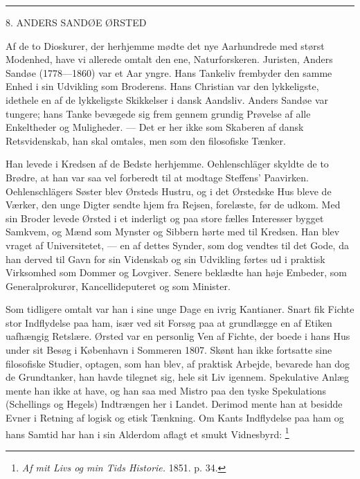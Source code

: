 \documentclass[12pt,a4paper,openany]{book}
\newcommand{\opage}[1]{\marginnote{\footnotesize\textit{[#1]}}}
\begin{document}
\begin{center}\rule{2cm}{0.4pt}\end{center}

\setcounter{footnote}{0}%
\opage{73}

\begin{center}\large 8. ANDERS SANDØE ØRSTED\end{center}

Af de to Dioskurer, der herhjemme mødte det nye Aarhundrede med størst
Modenhed, have vi allerede omtalt den ene, Naturforskeren. Juristen, Anders
Sandøe (1778---1860) var et Aar yngre. Hans Tankeliv frembyder den samme Enhed
i sin Udvikling som Broderens. Hans Christian var den lykkeligste, idethele en
af de lykkeligste Skikkelser i dansk Aandsliv. Anders Sandøe var tungere; hans
Tanke bevægede sig frem gennem grundig Prøvelse af alle Enkeltheder og
Muligheder. --- Det er her ikke som Skaberen af dansk Retsvidenskab, han skal
omtales, men som den filosofiske Tænker.

Han levede i Kredsen af de Bedste herhjemme. Oehlenschläger skyldte de to
Brødre, at han var saa vel forberedt til at modtage Steffens' Paavirken.
Oehlenschlägers Søster blev Ørsteds Hustru, og i det Ørstedske Hus bleve de
Værker, den unge Digter sendte hjem fra Rejsen, forelæste, før de udkom. Med
sin Broder levede Ørsted i et inderligt og paa store fælles Interesser bygget
Samkvem, og Mænd som Mynster og Sibbern hørte med til Kredsen. Han blev vraget
af Universitetet, --- en af dettes Synder, som dog vendtes til det Gode, da han
derved til Gavn for sin Videnskab og sin Udvikling førtes ud i praktisk
Virksomhed som Dommer og Lovgiver. Senere beklædte han høje Embeder, som
Generalprokurør, Kancellideputeret og som Minister.

Som tidligere omtalt var han i sine unge Dage en ivrig Kantianer. Snart fik
Fichte stor Indflydelse paa ham, især ved sit Forsøg paa at grundlægge en af
Etiken uafhængig Retslære. Ørsted var en personlig Ven af Fichte, der boede
\setcounter{footnote}{0}%
\opage{74}i hans Hus under sit Besøg i København i Sommeren 1807. Skønt han
ikke fortsatte sine filosofiske Studier, optagen, som han blev, af praktisk
Arbejde, bevarede han dog de Grundtanker, han havde tilegnet sig, hele sit Liv
igennem. Spekulative Anlæg mente han ikke at have, og han saa med Mistro paa
den tyske Spekulations (Schellings og Hegels) Indtrængen her i Landet. Derimod
mente han at besidde Evner i Retning af logisk og etisk Tænkning. Om Kants
Indflydelse paa ham og hans Samtid har han i sin Alderdom aflagt et smukt
Vidnesbyrd:%
\footnote[1]{\textit{Af mit Livs og min Tids Historie.} 1851. p. 34.}
\end{document}
